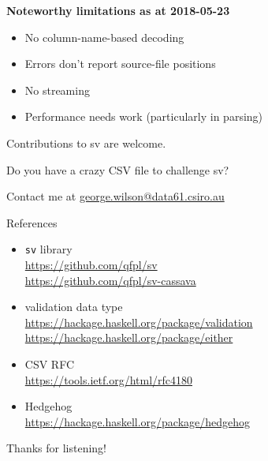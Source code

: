 \documentclass[UKenglish,usenames,dvipsnames,svgnames,table,aspectratio=169,mathserif]{beamer}
\newcommand{\nl}{\vspace{\baselineskip}}
\newcommand{\textslide}[1]{{
\begin{frame}
\begin{center}

#1

\end{center}
\end{frame}
}}
\begin{document}
\begin{frame}

{\bf Noteworthy limitations as at 2018-05-23}

\begin{itemize}
\item No column-name-based decoding
\item Errors don't report source-file positions
\item No streaming
\item Performance needs work (particularly in parsing)
\end{itemize}
\end{frame}


\textslide{{\Large

Contributions to sv are welcome.

\nl

Do you have a crazy CSV file to challenge sv?

\nl

Contact me at \href{mailto:george.wilson@data61.csiro.au}{george.wilson@data61.csiro.au}
}}


\textslide{
{\huge References}

\begin{itemize}
\item {\tt sv} library \\
  \url{https://github.com/qfpl/sv} \\
  \url{https://github.com/qfpl/sv-cassava}
\item validation data type \\
  \url{https://hackage.haskell.org/package/validation} \\
  \url{https://hackage.haskell.org/package/either}
\item CSV RFC \\
  \url{https://tools.ietf.org/html/rfc4180}
\item Hedgehog \\
  \url{https://hackage.haskell.org/package/hedgehog}
\end{itemize}
}

\textslide{\Huge Thanks for listening!}
\end{document}
